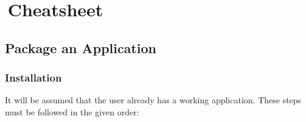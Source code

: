 \section{\,Cheatsheet}



\subsection{Package an Application}


\subsubsection{Installation}

It will be assumed that the user already has a working
 application. These steps must be followed in the given order:

